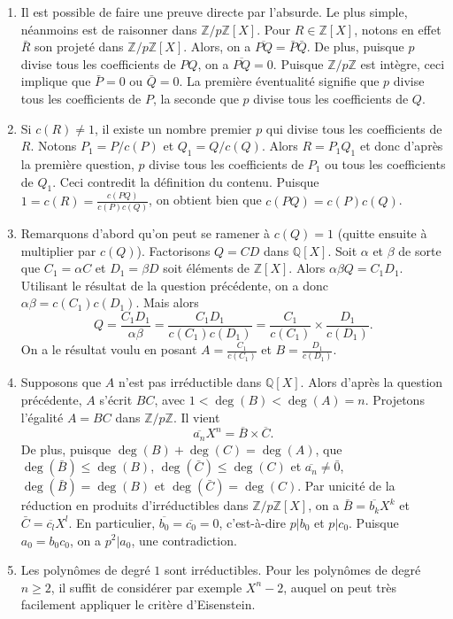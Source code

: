 \documentclass[11pt,a4paper]{article}
\begin{document}
	\begin{corrige}
		\begin{enumerate}
			
			\item  Il est possible de faire une preuve directe par l'absurde. Le plus simple, néanmoins est de raisonner dans $\mathbb Z/p\mathbb Z[X]$. Pour $R\in\mathbb Z[X]$, notons en effet $\bar R$ son projeté dans $\mathbb Z/p\mathbb Z[X]$. Alors, on a $\overline{PQ}=\bar P\bar Q$. De plus, puisque $p$ divise tous les coefficients de $PQ$, on a $\overline{PQ}=0$. Puisque $\mathbb Z/p\mathbb Z$ est intègre, ceci implique que $\bar P=0$ ou $\bar Q=0$. La première éventualité signifie que $p$ divise tous les coefficients de $P$, la seconde que $p$ divise tous les coefficients de $Q$.
			
			\item  Si $c(R)\neq 1$, il existe un nombre premier $p$ qui divise tous les coefficients de $R$. Notons $P_1=P/c(P)$ et $Q_1=Q/c(Q)$. Alors $R=P_1Q_1$ et donc d'après la première question, $p$ divise tous les coefficients de $P_1$ ou tous les coefficients de $Q_1$. Ceci contredit la définition du contenu. Puisque $1=c(R)=\frac{c(PQ)}{c(P)c(Q)}$, on obtient bien que $c(PQ)=c(P)c(Q)$.
			
			\item  Remarquons d'abord qu'on peut se ramener à $c(Q)=1$ (quitte ensuite à multiplier par $c(Q)$). Factorisons  $Q=CD$ dans $\mathbb Q[X]$. Soit $\alpha$ et $\beta$ de sorte que $C_1=\alpha C$ et $D_1=\beta D$ soit éléments de $\mathbb Z[X]$. Alors $\alpha \beta Q=C_1D_1$. Utilisant le résultat de la question précédente, on a donc
			$\alpha\beta=c(C_1)c(D_1)$. Mais alors 
			$$Q=\frac{C_1 D_1}{\alpha\beta}=\frac{C_1D_1}{c(C_1)c(D_1)}=\frac{C_1}{c(C_1)}\times \frac {D_1}{c(D_1)}.$$
			On a le résultat voulu en posant $A=\frac{C_1}{c(C_1)}$ et $B=\frac{D_1}{c(D_1)}$.
			
			\item  Supposons que $A$ n'est pas irréductible dans $\mathbb Q[X]$. Alors d'après la question précédente,
			$A$ s'écrit $BC$, avec $1<\deg(B)<\deg(A)=n$. Projetons l'égalité $A=BC$ dans $\mathbb Z/p\mathbb Z$. Il vient 
			$$\overline{a_n}X^n =\overline{B}\times\overline{C}.$$
			De plus, puisque $\deg(B)+\deg(C)=\deg(A)$, que $\deg(\bar B)\leq \deg(B)$, $\deg(\bar C)\leq \deg(C)$
			et $\overline{a_n}\neq \bar 0$, $\deg(\bar B)=\deg(B)$ et $\deg(\bar C)=\deg(C)$. Par unicité de la réduction en produits d'irréductibles dans $\mathbb Z/p\mathbb Z[X]$, on a $\bar B=\overline{b_k}X^k$ et 
			$\bar C=\overline{c_l}X^l$. En particulier, $\overline{b_0}=\overline{c_0}=0$, c'est-à-dire $p|b_0$ et $p|c_0$. Puisque $a_0=b_0c_0$, on a $p^2|a_0$, une contradiction.
			
			\item  Les polynômes de degré $1$ sont irréductibles. Pour les polynômes de degré $n\geq 2$, il suffit de considérer par exemple $X^n-2$, auquel on peut très facilement appliquer le critère d'Eisenstein.
			
		\end{enumerate}
	\end{corrige}
	
\end{document}
